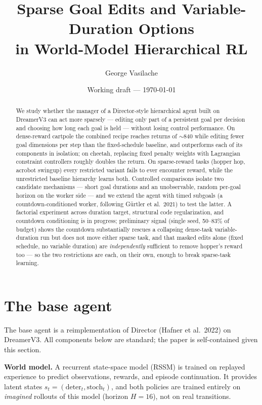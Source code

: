 \documentclass[10pt]{article}
\title{Sparse Goal Edits and Variable-Duration Options\\in World-Model Hierarchical RL}
\author{George Vasilache}
\date{Working draft --- \today}
\begin{document}
\maketitle

\begin{abstract}
We study whether the manager of a Director-style hierarchical agent built on
DreamerV3 can act more sparsely --- editing only part of a persistent goal per
decision and choosing how long each goal is held --- without losing control
performance. On dense-reward cartpole the combined recipe reaches returns of
$\sim$840 while editing fewer goal dimensions per step than the fixed-schedule
baseline, and outperforms each of its components in isolation; on cheetah,
replacing fixed penalty weights with Lagrangian constraint controllers roughly
doubles the return. On sparse-reward tasks (hopper hop, acrobot swingup) every
restricted variant fails to ever encounter reward, while the unrestricted
baseline hierarchy learns both. Controlled comparisons isolate two candidate
mechanisms --- short goal durations and an unobservable, random per-goal
horizon on the worker side --- and we extend the agent with timed subgoals
(a countdown-conditioned worker, following G\"urtler et al.\ 2021) to test the
latter. A factorial experiment across duration target, structural code
regularization, and countdown conditioning is in progress; preliminary signal
(single seed, 50--83\% of budget) shows the countdown substantially rescues a
collapsing dense-task variable-duration run but does not move either sparse
task, and that masked edits alone (fixed schedule, no variable duration) are
\emph{independently} sufficient to remove hopper's reward too --- so the two
restrictions are each, on their own, enough to break sparse-task learning.
\end{abstract}

\section{The base agent}
\label{sec:base}

The base agent is a reimplementation of Director (Hafner et al.\ 2022) on
DreamerV3. All components below are standard; the paper is self-contained given
this section.

\textbf{World model.} A recurrent state-space model (RSSM) is trained on replayed
experience to predict observations, rewards, and episode continuation. It
provides latent states $s_t = (\text{deter}_t, \text{stoch}_t)$, and both
policies are trained entirely on \emph{imagined} rollouts of this model
(horizon $H{=}16$), not on real transitions.
\end{document}
